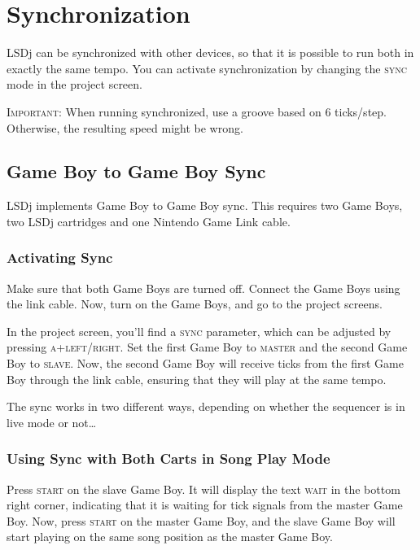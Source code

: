 \chapter{Synchronization}
\label{sync-chapter}

LSDj can be synchronized with other devices, so that it is possible to run both in exactly the same tempo. You can activate synchronization by changing the \textsc{sync} mode in the project screen.

\textsc{Important}: When running synchronized, use a groove based on 6 ticks/step. Otherwise, the resulting speed might be wrong.

\section{Game Boy to Game Boy Sync}

LSDj implements Game Boy to Game Boy sync. This requires two Game Boys, two LSDj cartridges and one Nintendo Game Link cable.

\subsection{Activating Sync}

Make sure that both Game Boys are turned off. Connect the Game Boys using the link cable. Now, turn on the Game Boys, and go to the project screens.

In the project screen, you'll find a \textsc{sync} parameter, which can be adjusted by pressing \textsc{a+left/right}. Set the first Game Boy to \textsc{master} and the second Game Boy to \textsc{slave}. Now, the second Game Boy will receive ticks from the first Game Boy through the link cable, ensuring that they will play at the same tempo.

The sync works in two different ways, depending on whether the sequencer is in live mode or not\ldots

\subsection{Using Sync with Both Carts in Song Play Mode}

Press \textsc{start} on the slave Game Boy. It will display the text \textsc{wait} in the bottom right corner, indicating that it is waiting for tick signals from the master Game Boy. Now, press \textsc{start} on the master Game Boy, and the slave Game Boy will start playing on the same song position as the master Game Boy.

